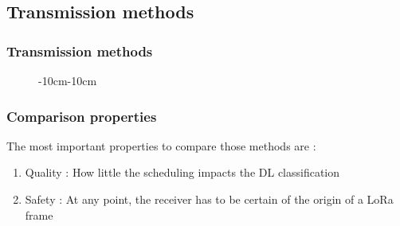 \subsection{Transmission methods}
\begin{frame}
  \frametitle{Transmission methods}


  \begin{figure}[ht]
  \begin{adjustwidth}{-10cm}{-10cm}
    \centering

    \end{adjustwidth}
  \end{figure}

\end{frame}


\begin{frame}
  \frametitle{Comparison properties}
  The most important properties to compare those methods are :
  \begin{enumerate}
    \item Quality : How little the scheduling impacts the DL classification
    \item Safety : At any point, the receiver has to be certain of the origin of a LoRa frame
  \end{enumerate}

\end{frame}

